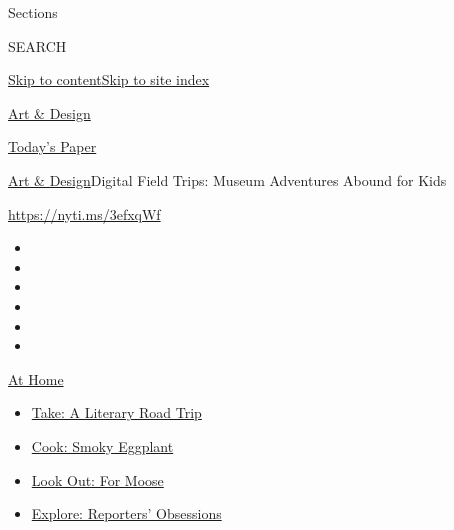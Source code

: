 Sections

SEARCH

\protect\hyperlink{site-content}{Skip to
content}\protect\hyperlink{site-index}{Skip to site index}

\href{https://www.nytimes3xbfgragh.onion/section/arts/design}{Art \&
Design}

\href{https://myaccount.nytimes3xbfgragh.onion/auth/login?response_type=cookie\&client_id=vi}{}

\href{https://www.nytimes3xbfgragh.onion/section/todayspaper}{Today's
Paper}

\href{/section/arts/design}{Art \& Design}\textbar{}Digital Field Trips:
Museum Adventures Abound for Kids

\url{https://nyti.ms/3efxqWf}

\begin{itemize}
\item
\item
\item
\item
\item
\item
\end{itemize}

\href{https://www.nytimes3xbfgragh.onion/spotlight/at-home?action=click\&pgtype=Article\&state=default\&region=TOP_BANNER\&context=at_home_menu}{At
Home}

\begin{itemize}
\tightlist
\item
  \href{https://www.nytimes3xbfgragh.onion/2020/07/28/books/time-for-a-literary-road-trip.html?action=click\&pgtype=Article\&state=default\&region=TOP_BANNER\&context=at_home_menu}{Take:
  A Literary Road Trip}
\item
  \href{https://www.nytimes3xbfgragh.onion/2020/07/29/magazine/bored-with-your-home-cooking-some-smoky-eggplant-will-fix-that.html?action=click\&pgtype=Article\&state=default\&region=TOP_BANNER\&context=at_home_menu}{Cook:
  Smoky Eggplant}
\item
  \href{https://www.nytimes3xbfgragh.onion/2020/07/27/travel/moose-michigan-isle-royale.html?action=click\&pgtype=Article\&state=default\&region=TOP_BANNER\&context=at_home_menu}{Look
  Out: For Moose}
\item
  \href{https://www.nytimes3xbfgragh.onion/interactive/2020/at-home/even-more-reporters-editors-diaries-lists-recommendations.html?action=click\&pgtype=Article\&state=default\&region=TOP_BANNER\&context=at_home_menu}{Explore:
  Reporters' Obsessions}
\end{itemize}

